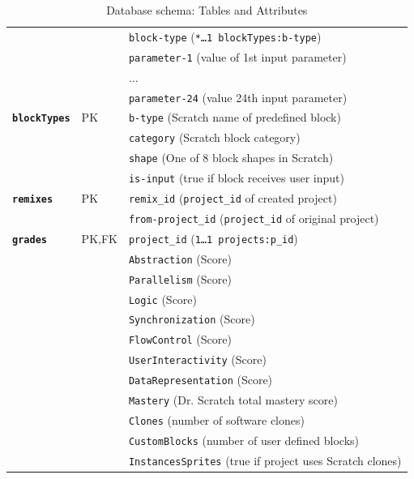 \documentclass[10pt, conference]{IEEEtran}
\begin{document}
\begin{table}[]
\begin{tabular}{llp{5.4cm}}
		&  & \texttt{block-type} (\texttt{\scriptsize{*\ldots1 blockTypes:b-type}})\\
		&  & \texttt{parameter-1} (value of 1st input parameter)\\
		&  & ... \\
		&  & \texttt{parameter-24} (value 24th input parameter)\\
		\hline
		\textbf{\texttt{blockTypes}} & PK & \texttt{b-type} (Scratch name of predefined block)\\
		&  & \texttt{category} (Scratch block category)\\
		&  & \texttt{shape} (One of 8 block shapes in Scratch)\\
		&  & \texttt{is-input} (true if block receives user input)\\
		\hline
		\textbf{\texttt{remixes}} & PK  & \texttt{remix\_id} (\texttt{\scriptsize{project\_id}} of created project)\\
		&  & \texttt{from-project\_id} (\texttt{\scriptsize{project\_id}} of original project)\\
		\hline
		\textbf{\texttt{grades}} & PK,FK & \texttt{project\_id} (\texttt{\scriptsize{1\ldots1 projects:p\_id}})\\

		& & \texttt{Abstraction} (Score)\\
		& & \texttt{Parallelism} (Score)\\
		& & \texttt{Logic} (Score)\\
		& & \texttt{Synchronization} (Score)\\
		& & \texttt{FlowControl} (Score)\\
		& & \texttt{UserInteractivity} (Score)\\
		& & \texttt{DataRepresentation} (Score)\\
		& & \texttt{Mastery} (Dr. Scratch total mastery score)\\
		& & \texttt{Clones} (number of software clones)\\
		& & \texttt{CustomBlocks} (number of user defined blocks)\\
		& & \texttt{InstancesSprites} (true if project uses Scratch clones)\\
		\hline
	\end{tabular}
	\caption{Database schema: Tables and Attributes}
	\label{tbl-dbschema}
\end{table}
\end{document}
